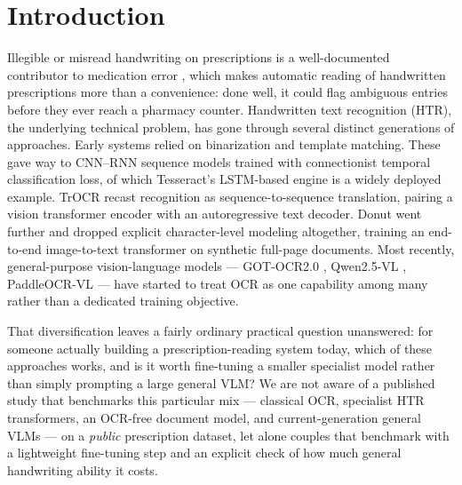 \documentclass[12pt]{article}
\begin{document}
\begin{abstract}
\vspace{4pt}
\noindent\textbf{Keywords:} optical character recognition, handwritten text recognition, vision-language
models, LoRA, parameter-efficient fine-tuning, catastrophic forgetting, medication safety, clinical NLP
\end{abstract}

\section{Introduction}

Illegible or misread handwriting on prescriptions is a well-documented contributor to medication error
\citep{Bryan2021LASA,Ostini2012LASA}, which makes automatic reading of handwritten prescriptions more than
a convenience: done well, it could flag ambiguous entries before they ever reach a pharmacy counter.
Handwritten text recognition (HTR), the underlying technical problem, has gone through several distinct
generations of approaches. Early systems relied on binarization and template matching. These gave way to
CNN--RNN sequence models trained with connectionist temporal classification loss, of which Tesseract's
LSTM-based engine \citep{Smith2007Tesseract} is a widely deployed example. TrOCR \citep{Li2023TrOCR} recast
recognition as sequence-to-sequence translation, pairing a vision transformer encoder with an autoregressive
text decoder. Donut \citep{Kim2022Donut} went further and dropped explicit character-level modeling
altogether, training an end-to-end image-to-text transformer on synthetic full-page documents. Most
recently, general-purpose vision-language models --- GOT-OCR2.0 \citep{Wei2024GOTOCR},
Qwen2.5-VL \citep{Bai2025Qwen}, PaddleOCR-VL \citep{Cui2025PaddleOCRVL} --- have started to treat OCR as one
capability among many rather than a dedicated training objective.

That diversification leaves a fairly ordinary practical question unanswered: for someone actually building
a prescription-reading system today, which of these approaches works, and is it worth fine-tuning a smaller
specialist model rather than simply prompting a large general VLM? We are not aware of a published study
that benchmarks this particular mix --- classical OCR, specialist HTR transformers, an OCR-free document
model, and current-generation general VLMs --- on a \textit{public} prescription dataset, let alone couples
that benchmark with a lightweight fine-tuning step and an explicit check of how much general handwriting
ability it costs.
\end{document}
